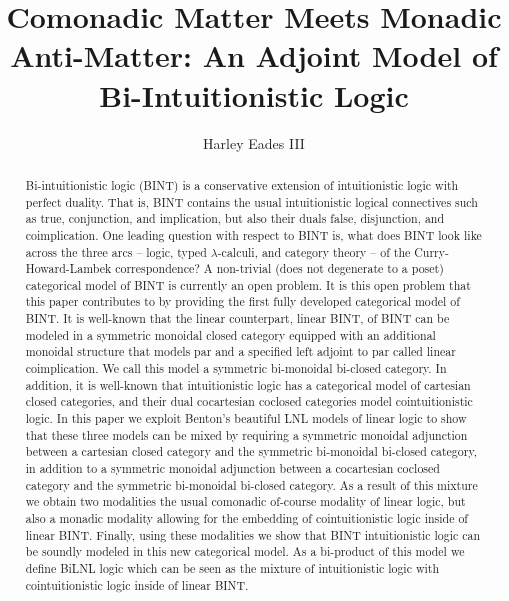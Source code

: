 \documentclass{lmcs}
\date{}
\begin{document}
\title{Comonadic Matter Meets Monadic Anti-Matter: An Adjoint Model of Bi-Intuitionistic Logic}
\author{Harley Eades III}
\address{Computer and Information Sciences, Augusta University, Augusta, GA}

\maketitle 

\begin{abstract}

  Bi-intuitionistic logic (BINT) is a conservative extension of
  intuitionistic logic with perfect duality.  That is, BINT contains
  the usual intuitionistic logical connectives such as true,
  conjunction, and implication, but also their duals false,
  disjunction, and coimplication. One leading question with respect
  to BINT is, what does BINT look like across the three arcs -- logic,
  typed $\lambda$-calculi, and category theory -- of the
  Curry-Howard-Lambek correspondence?  A non-trivial (does not
  degenerate to a poset) categorical model of BINT is currently an
  open problem.  It is this open problem that this paper contributes
  to by providing the first fully developed categorical model of BINT.
  It is well-known that the linear counterpart, linear BINT, of BINT
  can be modeled in a symmetric monoidal closed category equipped with
  an additional monoidal structure that models par and a specified
  left adjoint to par called linear coimplication.  We call this
  model a symmetric bi-monoidal bi-closed category. In addition, it is
  well-known that intuitionistic logic has a categorical model of
  cartesian closed categories, and their dual cocartesian coclosed
  categories model cointuitionistic logic.  In this paper we exploit
  Benton's beautiful LNL models of linear logic to show that these
  three models can be mixed by requiring a symmetric monoidal
  adjunction between a cartesian closed category and the symmetric
  bi-monoidal bi-closed category, in addition to a symmetric monoidal
  adjunction between a cocartesian coclosed category and the
  symmetric bi-monoidal bi-closed category.  As a result of this
  mixture we obtain two modalities the usual comonadic of-course
  modality of linear logic, but also a monadic modality allowing for
  the embedding of cointuitionistic logic inside of linear BINT.
  Finally, using these modalities we show that BINT intuitionistic
  logic can be soundly modeled in this new categorical model. As a
  bi-product of this model we define BiLNL logic which can be seen as
  the mixture of intuitionistic logic with cointuitionistic logic
  inside of linear BINT.

\end{abstract}
\end{document}
